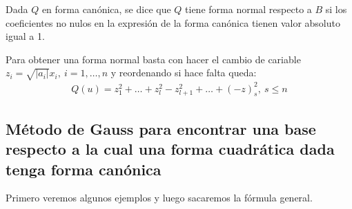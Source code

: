 \documentclass[14pt]{book}
\begin{document}
\begin{dfn}
	Dada $Q$ en forma canónica, se dice que $Q$ tiene forma normal respecto a $B$ si los coeficientes no nulos en la expresión de la forma canónica tienen valor absoluto igual a 1.
\end{dfn}

Para obtener una forma normal basta con hacer el cambio de cariable $z_i = \sqrt{|a_i|}x_i,\ i = 1, \dots, n$ y reordenando si hace falta queda:
\begin{align*}
	Q(u) = z_1^2 + \dots + z_l^2 - z_{l + 1}^2 + \dots + (-z)_s^2,\ s \leq n
\end{align*}

\subsection{Método de Gauss para encontrar una base respecto a la cual una forma cuadrática dada tenga forma canónica}

Primero veremos algunos ejemplos y luego sacaremos la fórmula general.
\end{document}
